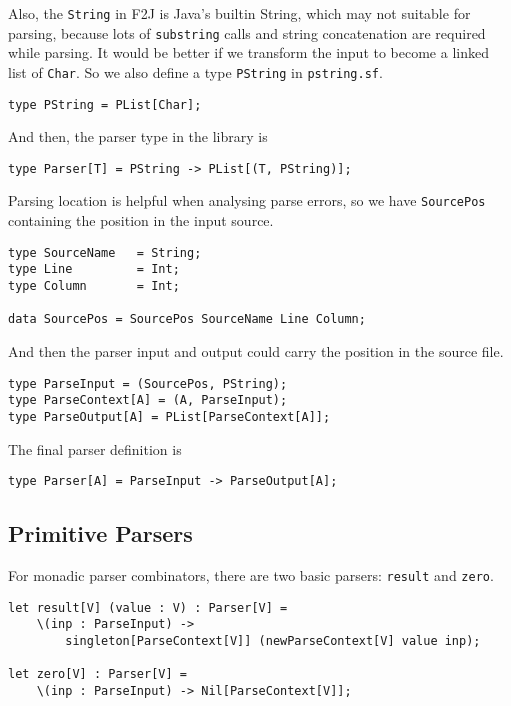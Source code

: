 Also, the \texttt{String} in F2J is Java's builtin String, which may not suitable for parsing, because lots of \texttt{substring} calls and string concatenation are required while parsing. It would be better if we transform the input to become a linked list of \texttt{Char}. So we also define a type \texttt{PString} in \texttt{pstring.sf}.

\begin{lstlisting}
type PString = PList[Char];
\end{lstlisting}

And then, the parser type in the library is

\begin{lstlisting}
type Parser[T] = PString -> PList[(T, PString)];
\end{lstlisting}

Parsing location is helpful when analysing parse errors, so we have \texttt{SourcePos} containing the position in the input source.

\begin{lstlisting}
type SourceName   = String;
type Line         = Int;
type Column       = Int;

data SourcePos = SourcePos SourceName Line Column;
\end{lstlisting}

And then the parser input and output could carry the position in the source file.

\begin{lstlisting}
type ParseInput = (SourcePos, PString);
type ParseContext[A] = (A, ParseInput);
type ParseOutput[A] = PList[ParseContext[A]];
\end{lstlisting}

The final parser definition is

\begin{lstlisting}
type Parser[A] = ParseInput -> ParseOutput[A];
\end{lstlisting}

\subsection{Primitive Parsers}

For monadic parser combinators, there are two basic parsers: \texttt{result} and \texttt{zero}.

\begin{lstlisting}
let result[V] (value : V) : Parser[V] =
    \(inp : ParseInput) ->
        singleton[ParseContext[V]] (newParseContext[V] value inp);

let zero[V] : Parser[V] =
    \(inp : ParseInput) -> Nil[ParseContext[V]];
\end{lstlisting}

